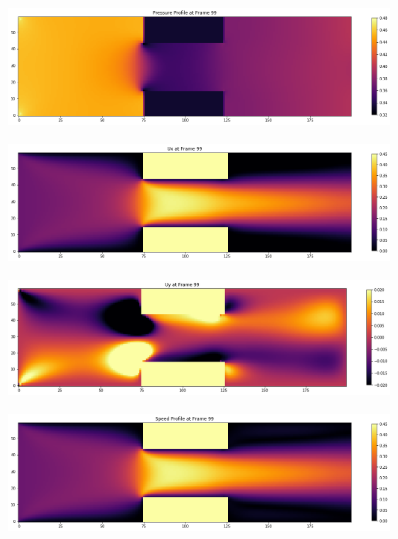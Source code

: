 \documentclass[11pt]{article}
\begin{document}
\begin{center}
\begin{figure}
\includegraphics[width=0.90\textwidth]{lbm_mbc_pressure.png}
\end{figure}

\begin{figure}
\includegraphics[width=0.90\textwidth]{lbm_mbc_ux.png}
\end{figure}

\begin{figure}
\includegraphics[width=0.90\textwidth]{lbm_mbc_uy.png}
\end{figure}

\begin{figure}
\includegraphics[width=0.90\textwidth]{lbm_mbc_speed.png}
\end{figure}
\end{center}
\end{document}
